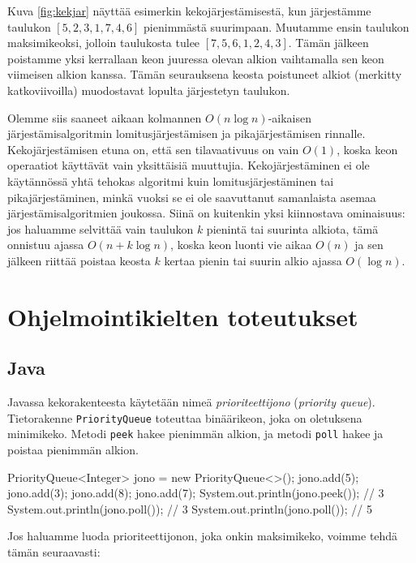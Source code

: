 Kuva \ref{fig:kekjar} näyttää esimerkin kekojärjestämisestä,
kun järjestämme taulukon $[5,2,3,1,7,4,6]$
pienimmästä suurimpaan.
Muutamme ensin taulukon maksimikeoksi,
jolloin taulukosta tulee $[7,5,6,1,2,4,3]$.
Tämän jälkeen poistamme yksi kerrallaan
keon juuressa olevan alkion vaihtamalla sen
keon viimeisen alkion kanssa.
Tämän seurauksena keosta poistuneet alkiot
(merkitty katkoviivoilla) muodostavat lopulta järjestetyn taulukon.

Olemme siis saaneet aikaan kolmannen $O(n \log n)$-aikaisen
järjestämis\-algoritmin lomitusjärjestämisen ja pikajärjestämisen rinnalle.
Kekojärjestä\-misen etuna on, että sen tilavaativuus on vain $O(1)$,
koska keon operaatiot käyttävät vain yksittäisiä muuttujia.
Kekojärjestäminen ei ole käytännössä yhtä tehokas algoritmi
kuin lomitusjärjestäminen tai pikajärjestäminen,
min\-kä vuoksi se ei ole saavuttanut samanlaista asemaa
järjestämisalgoritmien joukossa.
Siinä on kuitenkin yksi kiinnostava ominaisuus:
jos haluamme selvittää vain taulukon $k$ pienintä tai suurinta
alkiota, tämä onnistuu ajassa $O(n+k \log n)$,
koska keon luonti vie aikaa $O(n)$ ja sen jälkeen riittää poistaa keosta
$k$ kertaa pienin tai suurin alkio ajassa $O(\log n)$.

\section{Ohjelmointikielten toteutukset}

\subsection{Java}


Javassa kekorakenteesta käytetään nimeä \emph{prioriteettijono} (\emph{priority queue}).
Tietorakenne \texttt{PriorityQueue}
toteuttaa binäärikeon, joka on oletuksena minimikeko.
Metodi \texttt{peek} hakee pienimmän alkion, ja
metodi \texttt{poll} hakee ja poistaa pienimmän alkion.

\begin{code}
PriorityQueue<Integer> jono = new PriorityQueue<>();
jono.add(5);
jono.add(3);
jono.add(8);
jono.add(7);
System.out.println(jono.peek()); // 3
System.out.println(jono.poll()); // 3
System.out.println(jono.poll()); // 5
\end{code}

Jos haluamme luoda prioriteettijonon, joka onkin
maksimikeko, voimme tehdä tämän seuraavasti:


